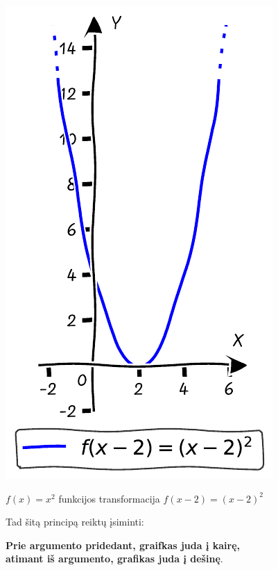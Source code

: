 \documentclass[nobib]{tufte-handout}
\begin{document}
\begin{marginfigure}%

  \includegraphics[width=\linewidth]{./graphs/quadratic_func_transform_rshifted_2.pdf}
  \caption{$f(x)=x^2$ funkcijos transformacija $f(x-2)=(x-2)^2$}
  \label{fig:quadratic_func_transform_rshifted_2}
\end{marginfigure}

Tad šitą principą reiktų įsiminti:
\begin{center}
  \textbf{Prie argumento pridedant, graifkas juda į kairę,\\ atimant iš
    argumento, grafikas juda į dešinę}.
\end{center}
\end{document}
